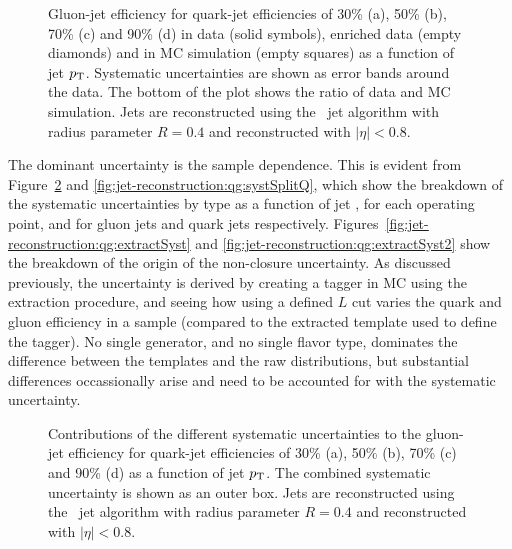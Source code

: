 \begin{figure}[htbp]
\begin{center}
\caption{
Gluon-jet efficiency for quark-jet efficiencies of 30\% (a), 50\% (b), 70\% (c) and 90\% (d) 
in data (solid symbols), enriched data (empty diamonds) and in \Herwigpp MC simulation 
(empty squares) as a function of jet $p_{\text{T}}$. 
Systematic uncertainties are shown as error bands around the data. The bottom of the plot 
shows the ratio of data and MC simulation. 
Jets are reconstructed using the \AKT\ jet algorithm with radius parameter 
$R=0.4$ and reconstructed with $|\eta|<0.8$.
}
\label{fig:jet-reconstruction:qg:perfDataMCHPP}
\end{center}
\end{figure}


The dominant uncertainty is the sample dependence. This is evident from Figure~\ref{fig:jet-reconstruction:qg:systSplit} and \ref{fig:jet-reconstruction:qg:systSplitQ}, which show the breakdown of the systematic uncertainties by type as a function of jet \pt, for each operating point, and for gluon jets and quark jets respectively. Figures~\ref{fig:jet-reconstruction:qg:extractSyst} and \ref{fig:jet-reconstruction:qg:extractSyst2} show the breakdown of the origin of the non-closure uncertainty. As discussed previously, the uncertainty is derived by creating a tagger in MC using the extraction procedure, and seeing how using a defined $L$ cut varies the quark and gluon efficiency in a sample (compared to the extracted template used to define the tagger). No single generator, and no single flavor type, dominates the difference between the templates and the raw distributions, but substantial differences occassionally arise and need to be accounted for with the systematic uncertainty.


\begin{figure}[htbp]
\begin{center}
\caption{
Contributions of the different systematic uncertainties to the gluon-jet efficiency 
for quark-jet efficiencies of 30\% (a), 50\% (b), 70\% (c) and 90\% (d) 
as a function of jet $p_{\text{T}}$. The combined systematic uncertainty is 
shown as an outer box.  
Jets are reconstructed using the \AKT\ jet algorithm with radius parameter 
$R=0.4$ and reconstructed with $|\eta|<0.8$. }
\label{fig:jet-reconstruction:qg:systSplit}
\end{center}
\end{figure}

